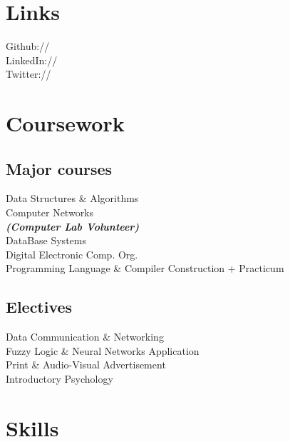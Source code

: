 \documentclass[]{deedy-resume-openfont}
\begin{document}
\begin{minipage}[t]{0.33\textwidth}
\section{Links} 
Github:// \href{https://github.com/sarweshshah}{} \\
LinkedIn://  \href{https://www.linkedin.com/in/sarweshshah/}{} \\
Twitter://  \href{https://twitter.com/sarweshshah}{} \\


\section{Coursework}


\subsection{Major courses}
Data Structures \& Algorithms \\
Computer Networks \\
{\footnotesize \textit{\textbf{(Computer Lab Volunteer) }}} \\
DataBase Systems \\
Digital Electronic Comp. Org. \\
Programming Language \& Compiler Construction + Practicum\\
\sectionsep

\subsection{Electives}
Data Communication \& Networking \\
Fuzzy Logic \& Neural Networks Application \\
Print \& Audio-Visual Advertisement \\
Introductory Psychology \\
\sectionsep


\section{Skills}

\end{minipage}
\end{document}
